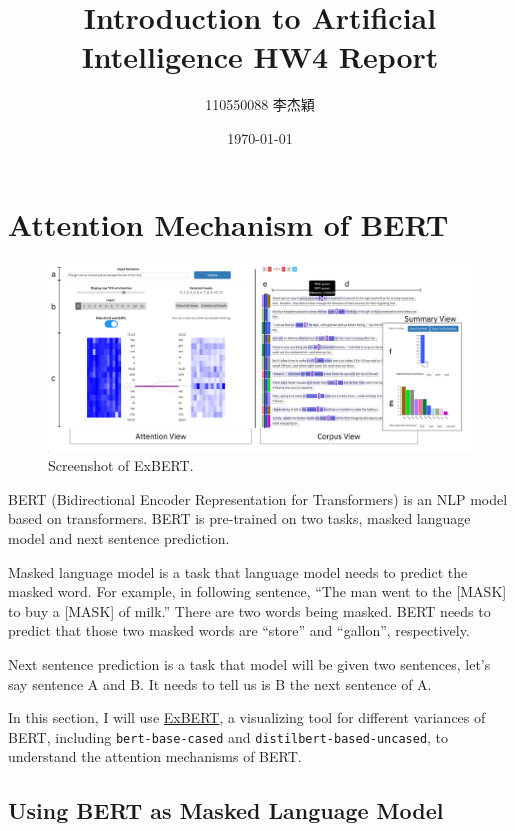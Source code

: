 \documentclass{article}[12pt]
\title{Introduction to Artificial Intelligence HW4 Report}
\author{110550088 李杰穎}
\date{\today}
\begin{document}
\maketitle

\section{Attention Mechanism of BERT}

\begin{figure}[htbp]
	\centering
	\includegraphics[width=\linewidth]{figure/exbert}
	\caption[]{Screenshot of ExBERT. \footnotemark}
	\label{fig:exbert}
\end{figure}

BERT (Bidirectional Encoder Representation for Transformers) is an NLP model based on transformers. BERT is pre-trained on two tasks, masked language model and next sentence prediction. 

Masked language model is a task that language model needs to predict the masked word. For example, in following sentence, ``The man went to the [MASK] to buy a [MASK] of milk.'' There are two words being masked. BERT needs to predict that those two masked words are ``store'' and ``gallon'', respectively.

Next sentence prediction is a task that model will be given two sentences, let's say sentence A and B. It needs to tell us is B the next sentence of A.

In this section, I will use \href{https://exbert.net}{ExBERT}, a visualizing tool for different variances of BERT, including \texttt{bert-base-cased} and \texttt{distilbert-based-uncased}, to understand the attention mechanisms of BERT.


\subsection{Using BERT as Masked Language Model}
\end{document}
